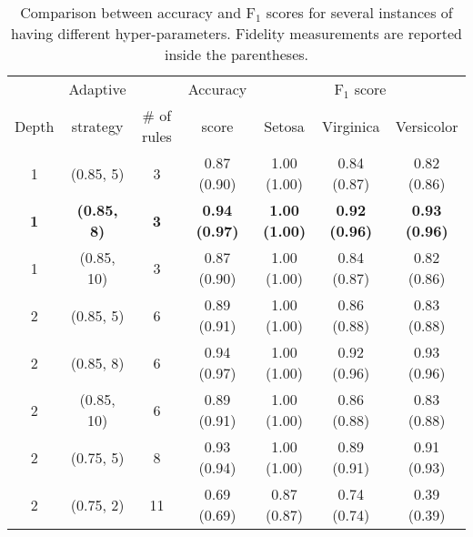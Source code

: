 
\begin{table}
	\caption{Comparison between accuracy and F$_1$ scores for several instances of \gridex{} having different hyper-parameters. Fidelity measurements are reported inside the parentheses.}
	\label{tab:gridex}
	\begin{tabular}{c|c|c|c|ccc}
		\toprule
		& Adaptive & & Accuracy & \multicolumn{3}{c}{F$_1$ score}\\
 		Depth & strategy & \# of rules & score & Setosa & Virginica & Versicolor \\
		\midrule
		1 & (0.85, 5) & 3 & 0.87 (0.90) & 1.00 (1.00) & 0.84 (0.87) & 0.82 (0.86) \\
		\textbf{1} & \textbf{(0.85, 8)} & \textbf{3} & \textbf{0.94 (0.97)} & \textbf{1.00 (1.00)} & \textbf{0.92 (0.96)} & \textbf{0.93 (0.96)} \\
		1 & (0.85, 10) & 3 & 0.87 (0.90) & 1.00 (1.00) & 0.84 (0.87) & 0.82 (0.86) \\
		2 & (0.85, 5) & 6 & 0.89 (0.91) & 1.00 (1.00) & 0.86 (0.88) & 0.83 (0.88) \\
		2 & (0.85, 8) & 6 & 0.94 (0.97) & 1.00 (1.00) & 0.92 (0.96) & 0.93 (0.96) \\
		2 & (0.85, 10) & 6 & 0.89 (0.91) & 1.00 (1.00) & 0.86 (0.88) & 0.83 (0.88) \\
		2 & (0.75, 5) & 8 & 0.93 (0.94) & 1.00 (1.00) & 0.89 (0.91) & 0.91 (0.93) \\
		2 & (0.75, 2) & 11 & 0.69 (0.69) & 0.87 (0.87) & 0.74 (0.74) & 0.39 (0.39) \\
		\bottomrule
	\end{tabular}
\end{table}
